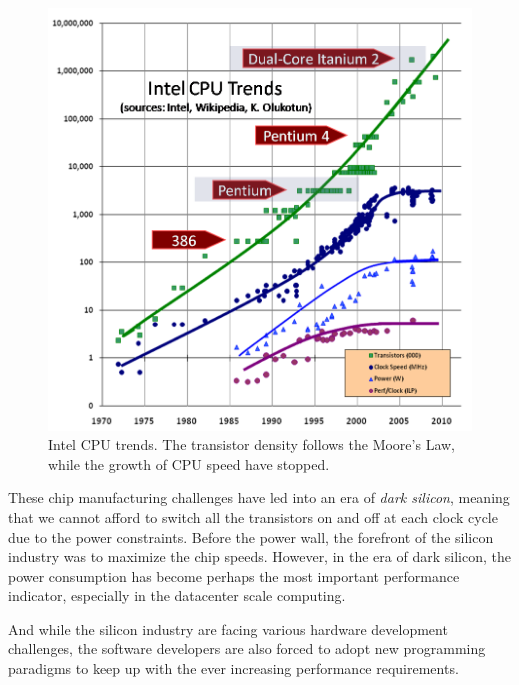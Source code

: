 \begin{figure}[]
  \begin{center}
    \includegraphics[width=\textwidth]{images/free-lunch-is-over.png}
    \caption{Intel CPU trends. The transistor density follows the Moore's Law, while the growth of CPU speed have stopped.~\cite{Sutter:2005:FLiO}}
    \label{fig:rne-example}
  \end{center}
\end{figure}

These chip manufacturing challenges have led into an era of \emph{dark silicon}, meaning that we cannot afford to switch all the transistors on and off at each clock cycle due to the power constraints. Before the power wall, the forefront of the silicon industry was to maximize the chip speeds. However, in the era of dark silicon, the power consumption has become perhaps the most important performance indicator, especially in the datacenter scale computing.~\cite{Sutter:2005:FLiO, Asanovic:2006:Landscape, Ributzka:2013:Concurrency, Zhang:2010:CloudComputing}

And while the silicon industry are facing various hardware development challenges, the software developers are also forced to adopt new programming paradigms to keep up with the ever increasing performance requirements.~\cite{Sutter:2005:FLiO}

